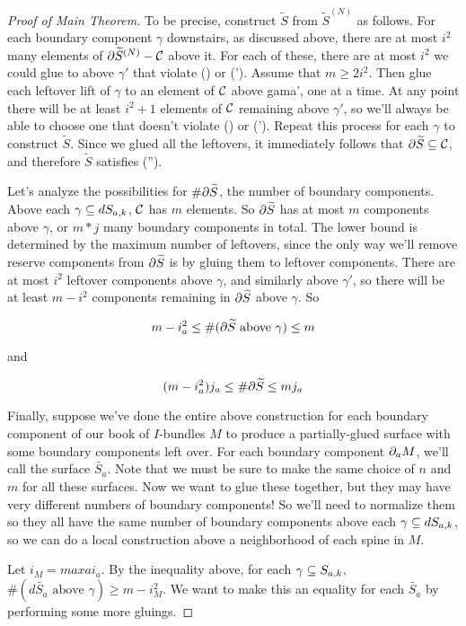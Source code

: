\begin{proof}[Proof of Main Theorem]
To be precise, construct $\widetilde{S}$ from $\widetilde{S}^{(N)}$ as follows.
For each boundary component $\gamma$ downstairs, as discussed above, there are
at most $i^2$ many elements of $\partial\widetilde{S}^{(N)}-\mathcal{C}$ above it. For each of
these, there are at most $i^2$ we could glue to above $\gamma'$ that violate
(\dag) or (\dag').  Assume that $m\geq 2i^2$.  Then glue each leftover lift of
$\gamma$ to an element of $\mathcal{C}$ above gama', one at a time. At any point there
will be at least $i^2+1$ elements of $\mathcal{C}$ remaining above $\gamma'$, so we'll
always be able to choose one that doesn't violate (\dag) or (\dag'). Repeat
this process for each $\gamma$ to construct $\widetilde{S}$.  Since we glued
all the leftovers, it immediately follows that $\partial\widetilde{S} \subseteq \mathcal{C}$, and
therefore $\widetilde{S}$ satisfies (\dag'').

Let's analyze the possibilities for $\#\partial\widetilde{S}$, the number of
boundary components. Above each $\gamma \subseteq dS_{a,k}$,
$\mathcal{C}$ has $m$ elements. So $\partial\widetilde{S}$ has at most $m$ components above
$\gamma$, or $m*j$ many boundary components in total. The lower bound is
determined by the maximum number of leftovers, since the only way we'll remove
reserve components from $\partial\widetilde{S}$ is by gluing them to leftover
components. There are at most $i^2$ leftover components above $\gamma$, and
similarly above $\gamma'$, so there will be at least $m - i^2$ components
remaining in $\partial\widetilde{S}$ above $\gamma$. So

\[ m-i_a^2 \leq \#(\partial\widetilde{S} \text{ above }\gamma) \leq m \]

and

\[ (m-i_a^2)j_a \leq \#\partial\widetilde{S} \leq mj_a \]

Finally, suppose we've done the entire above construction for each boundary
component of our book of $I$-bundles $M$ to produce a partially-glued surface
with some boundary components left over. For each boundary component $\partial_aM$,
we'll call the surface $\widetilde{S_a}$. Note that we must be sure to make the same
choice of $n$ and $m$ for all these surfaces. Now we want to glue these
together, but they may have very different numbers of boundary components! So
we'll need to normalize them so they all have the same number of boundary
components above each $\gamma \subseteq dS_{a,k}$, so we can do a local construction
above a neighborhood of each spine in $M$.

Let $i_M = max a i_a$. By the inequality above, for each $\gamma \subseteq S_{a,k}$,
$\#(d\widetilde{S_a} \text{ above } \gamma) \geq m - i_M^2$. We want to make
this an equality for each $\widetilde{S_a}$ by performing some more gluings.


\end{proof}
